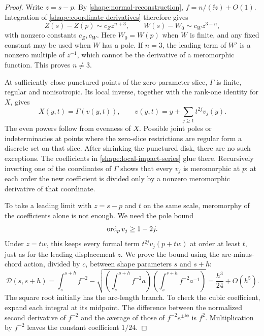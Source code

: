 \begin{proof}
Write \(z=s-p\). By \eqref{shape:normal-reconstruction},
\(f=n/(\ii z)+O(1)\). Integration of
\eqref{shape:coordinate-derivatives} therefore gives
\begin{equation}
 Z(s)-Z(p)\sim c_Z z^{n+3},\qquad
 W(s)-W_0\sim c_W z^{3-n},
 \label{shape:center-powers}
\end{equation}
with nonzero constants \(c_Z,c_W\). Here \(W_0=W(p)\) when \(W\) is
finite, and any fixed constant may be used when \(W\) has a pole. If
\(n=3\), the leading term of \(W'\) is a nonzero multiple of \(z^{-1}\),
which cannot be the derivative of a meromorphic function. This proves
\(n\ne3\).

At sufficiently close punctured points of the zero-parameter slice,
\(\Gamma\) is finite, regular and nonisotropic. Its local inverse,
together with the rank-one identity for \(X\), gives
\begin{equation}
 X(y,t)=\Gamma(v(y,t)),\qquad
 v(y,t)=y+\sum_{j\geq1}t^{2j}v_j(y).
 \label{shape:local-impact-series}
\end{equation}
The even powers follow from evenness of \(X\). Possible joint poles or
indeterminacies at points where the zero-slice restrictions are regular
form a discrete set on that slice. After shrinking the punctured disk,
there are no such exceptions. The coefficients in
\eqref{shape:local-impact-series} glue there. Recursively inverting one
of the coordinates of \(\Gamma\) shows that every \(v_j\) is
meromorphic at \(p\): at each order the new coefficient is divided only
by a nonzero meromorphic derivative of that coordinate.

To take a leading limit with \(z=s-p\) and \(t\) on the same scale,
meromorphy of the coefficients alone is not enough. We need the pole bound
\begin{equation}
 \operatorname{ord}_p v_j\geq1-2j.
 \label{shape:impact-coefficient-order}
\end{equation}
Under \(z=tw\), this keeps every formal term \(t^{2j}v_j(p+tw)\)
at order at least \(t\), just as for the leading displacement \(z\).
We prove the bound using the arc-minus-chord action, divided by \(c\),
between shape parameters \(s\) and \(s+h\):
\begin{equation}
 \mathcal D(s,s+h)=
 \int_s^{s+h}f^{-2}
 -\sqrt{\left(\int_s^{s+h}f^{-2}a\right)
              \left(\int_s^{s+h}f^{-2}a^{-1}\right)}
 =\frac{h^3}{24}+O(h^5).
 \label{shape:point-action}
\end{equation}
The square root initially has the arc-length branch. To check the cubic
coefficient, expand each integral at its midpoint. The difference
between the normalized second derivative of \(f^{-2}\) and the average
of those of \(f^{-2}e^{\pm\ii\phi}\) is \(f^2\). Multiplication by
\(f^{-2}\) leaves the constant coefficient \(1/24\).


\end{proof}
